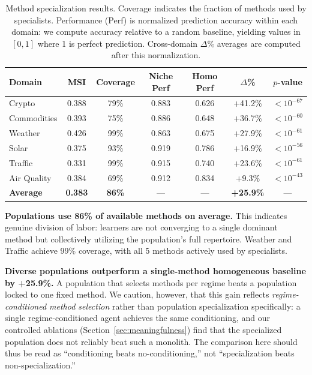 \documentclass{article}
\begin{document}
\begin{table}[t]
\centering
\small
\caption{Method specialization results. Coverage indicates the fraction of methods used by specialists. Performance (Perf) is normalized prediction accuracy within each domain: we compute accuracy relative to a random baseline, yielding values in $[0, 1]$ where 1 is perfect prediction. Cross-domain $\Delta$\% averages are computed after this normalization.}
\label{tab:method}
\begin{tabular}{lcccccc}
\toprule
\textbf{Domain} & \textbf{MSI} & \textbf{Coverage} & \textbf{Niche Perf} & \textbf{Homo Perf} & \textbf{$\Delta$\%} & \textbf{$p$-value} \\
\midrule
Crypto & 0.388 & 79\% & 0.883 & 0.626 & +41.2\% & $< 10^{-67}$ \\
Commodities & 0.393 & 75\% & 0.886 & 0.648 & +36.7\% & $< 10^{-60}$ \\
Weather & 0.426 & 99\% & 0.863 & 0.675 & +27.9\% & $< 10^{-61}$ \\
Solar & 0.375 & 93\% & 0.919 & 0.786 & +16.9\% & $< 10^{-56}$ \\
Traffic & 0.331 & 99\% & 0.915 & 0.740 & +23.6\% & $< 10^{-61}$ \\
Air Quality & 0.384 & 69\% & 0.912 & 0.834 & +9.3\% & $< 10^{-43}$ \\
\midrule
\textbf{Average} & \textbf{0.383} & \textbf{86\%} & --- & --- & \textbf{+25.9\%} & --- \\
\bottomrule
\end{tabular}
\end{table}

\textbf{Populations use 86\% of available methods on average.} This indicates genuine division of labor: learners are not converging to a single dominant method but collectively utilizing the population's full repertoire. Weather and Traffic achieve 99\% coverage, with all 5 methods actively used by specialists.

\textbf{Diverse populations outperform a single-method homogeneous baseline by +25.9\%.} A population that selects methods per regime beats a population locked to one fixed method. We caution, however, that this gain reflects \emph{regime-conditioned method selection} rather than population specialization specifically: a single regime-conditioned agent achieves the same conditioning, and our controlled ablations (Section~\ref{sec:meaningfulness}) find that the specialized population does not reliably beat such a monolith. The comparison here should thus be read as ``conditioning beats no-conditioning,'' not ``specialization beats non-specialization.''
\end{document}
